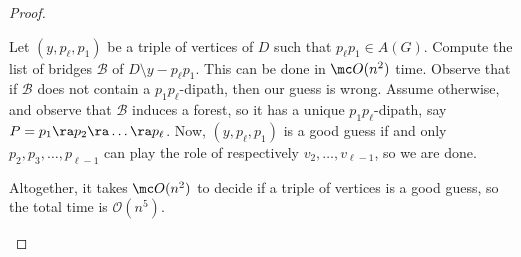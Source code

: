 \begin{proof}
\begin{proofclaim}
        Let $(y, p_{\ell}, p_1)$ be a triple of vertices of $D$ such that $p_{\ell}p_1 \in A(G)$. 
        Compute the list of bridges $\mathcal B$ of $D \setminus y - p_{\ell}p_1$. This can be done in $\mc O(n^2)$ time. Observe that if $\mathcal B$ does not contain a $p_1p_{\ell}$-dipath, then our guess is wrong. 
        Assume otherwise, and observe that $\mathcal B$ induces a forest, so it has a unique $p_1p_{\ell}$-dipath, say $P=p_1 \ra p_2 \ra \dots \ra p_{\ell}$. 
        Now, $(y, p_{\ell}, p_1)$ is a good guess if and only  $p_2, p_3, \dots, p_{\ell-1}$ can play the role of respectively $v_2, \dots, v_{\ell-1}$, so we are done. 

        Altogether, it takes $\mc O(n^2)$ to decide if a triple of vertices is a good guess, so the total time is $\mathcal O(n^5)$.
           
        
        
    \end{proofclaim}
    

\end{proof}
